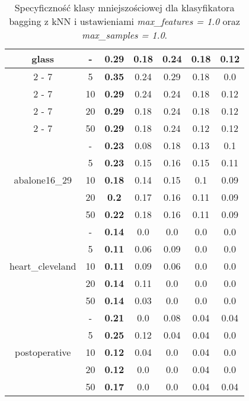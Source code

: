 \begin{table}[H]
\begin{center}
{\begin{tabular}{c|c|ccccc}
				\hline%
				\multirow{5}{*}{glass}&{-}&\textbf{0.29}&0.18&0.24&0.18&0.12\\%
				\cline{2%
					-%
					7}%
				&5&\textbf{0.35}&0.24&0.29&0.18&0.0\\%
				\cline{2%
					-%
					7}%
				&10&\textbf{0.29}&0.24&0.24&0.18&0.12\\%
				\cline{2%
					-%
					7}%
				&20&\textbf{0.29}&0.18&0.24&0.18&0.12\\%
				\cline{2%
					-%
					7}%
				&50&\textbf{0.29}&0.18&0.24&0.12&0.12\\%
				\hline%
				\multirow{5}{*}{abalone16\_29}&{-}&\textbf{0.23}&0.08&0.18&0.13&0.1\\%
				\cline{2%
					-%
					7}%
				&5&\textbf{0.23}&0.15&0.16&0.15&0.11\\%
				\cline{2%
					-%
					7}%
				&10&\textbf{0.18}&0.14&0.15&0.1&0.09\\%
				\cline{2%
					-%
					7}%
				&20&\textbf{0.2}&0.17&0.16&0.11&0.09\\%
				\cline{2%
					-%
					7}%
				&50&\textbf{0.22}&0.18&0.16&0.11&0.09\\%
				\hline%
				\multirow{5}{*}{heart\_cleveland}&{-}&\textbf{0.14}&0.0&0.0&0.0&0.0\\%
				\cline{2%
					-%
					7}%
				&5&\textbf{0.11}&0.06&0.09&0.0&0.0\\%
				\cline{2%
					-%
					7}%
				&10&\textbf{0.11}&0.09&0.06&0.0&0.0\\%
				\cline{2%
					-%
					7}%
				&20&\textbf{0.14}&0.11&0.0&0.0&0.0\\%
				\cline{2%
					-%
					7}%
				&50&\textbf{0.14}&0.03&0.0&0.0&0.0\\%
				\hline%
				\multirow{5}{*}{postoperative}&{-}&\textbf{0.21}&0.0&0.08&0.04&0.04\\%
				\cline{2%
					-%
					7}%
				&5&\textbf{0.25}&0.12&0.04&0.04&0.0\\%
				\cline{2%
					-%
					7}%
				&10&\textbf{0.12}&0.04&0.0&0.04&0.0\\%
				\cline{2%
					-%
					7}%
				&20&\textbf{0.12}&0.0&0.0&0.04&0.0\\%
				\cline{2%
					-%
					7}%
				&50&\textbf{0.17}&0.0&0.0&0.04&0.04\\%
				\hline%
			\end{tabular}}
			\caption{Specyficzność klasy mniejszościowej dla klasyfikatora bagging z kNN i ustawieniami \textit{max\_features = 1.0} oraz \textit{max\_samples = 1.0}.}
			\label{baggingknnspec}
		\end{center}
	\end{table}
